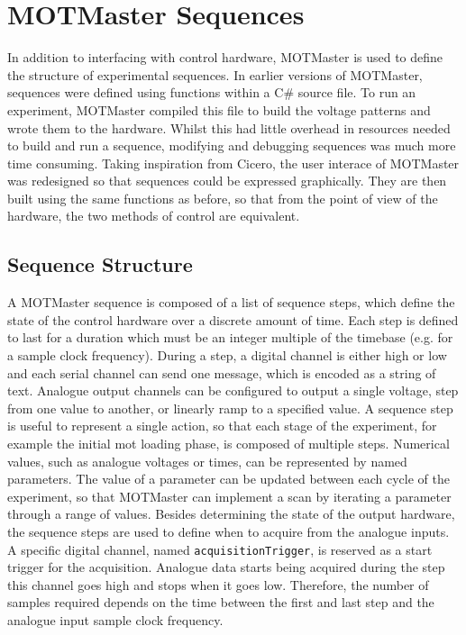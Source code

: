 \section{MOTMaster Sequences}
In addition to interfacing with control hardware, MOTMaster is used to define
the structure of experimental sequences. In earlier versions of MOTMaster,
sequences were defined using functions within a C\# source file. To run an
experiment, MOTMaster compiled this file to build the voltage patterns and
wrote them to the hardware. Whilst this had little overhead in resources
needed to build and run a sequence, modifying and debugging sequences was
much more time consuming. Taking inspiration from Cicero, the user interace
of MOTMaster was redesigned so that sequences could be expressed graphically.
They are then built using the same functions as before, so that from the
point of view of the hardware, the two methods of control are equivalent. 

\subsection{Sequence Structure}
A MOTMaster sequence is composed of a list of sequence steps, which define
the state of the control hardware over a discrete amount of time. Each step
is defined to last for a duration which must be an integer multiple of the
timebase (e.g.  for a 
sample clock frequency). During a step, a digital channel is either high or
low and each serial channel can send one message, which is encoded as a
string of text. Analogue output channels can be configured to output a single
voltage, step from one value to another, or linearly ramp to a specified
value. A sequence step is useful to represent a single action, so that each
stage of the experiment, for example the initial \ac{mot} loading phase, is
composed of multiple steps. Numerical values, such as analogue voltages or
times, can be represented by named parameters. The value of a parameter can
be updated between each cycle of the experiment, so that MOTMaster can
implement a scan by iterating a parameter through a range of values. Besides
determining the state of the output hardware, the sequence steps are used to
define when to acquire from the analogue inputs. A specific digital channel,
named \verb|acquisitionTrigger|, is reserved as a start trigger for the
acquisition. Analogue data starts being acquired during the step this channel
goes high and stops when it goes low. Therefore, the number of samples
required depends on the time between the first and last step and the analogue
input sample clock frequency.
